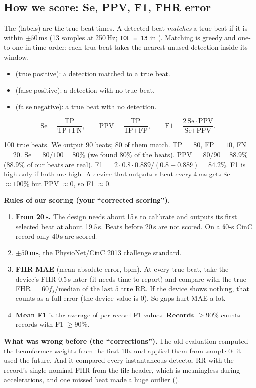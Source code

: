 \documentclass[11pt]{article}
\begin{document}
\subsection{How we score: Se, PPV, F1, FHR error}
\label{sec:scoring}
The  (labels) are the true beat times. A detected beat \emph{matches} a true beat if it is within $\pm 50$\,ms (13 samples at 250\,Hz; \texttt{TOL = 13} in ). Matching is greedy and one-to-one in time order: each true beat takes the nearest unused detection inside its window.
\begin{itemize}
  \item {} (true positive): a detection matched to a true beat.
  \item {} (false positive): a detection with no true beat.
  \item {} (false negative): a true beat with no detection.
\end{itemize}
\[
\text{Se} = \frac{\text{TP}}{\text{TP}+\text{FN}}, \qquad \text{PPV} = \frac{\text{TP}}{\text{TP}+\text{FP}}, \qquad \text{F1} = \frac{2\,\text{Se}\cdot\text{PPV}}{\text{Se}+\text{PPV}}.
\]
\begin{simple}
100 true beats. We output 90 beats; 80 of them match. TP $= 80$, FP $= 10$, FN $= 20$.
Se $= 80/100 = 80\%$ (we found 80\% of the beats). PPV $= 80/90 = 88.9\%$ (88.9\% of our beats are real). F1 $= 2\cdot 0.8\cdot 0.889/(0.8+0.889) = 84.2\%$.
F1 is high only if both are high. A device that outputs a beat every 4\,ms gets Se $\approx 100\%$ but PPV $\approx 0$, so F1 $\approx 0$.
\end{simple}

\textbf{Rules of our scoring (your ``corrected scoring'').}
\begin{enumerate}
  \item \textbf{From 20\,s.} The design needs about 15\,s to calibrate and outputs its first selected beat at about 19.5\,s. Beats before 20\,s are not scored. On a 60-s CinC record only 40\,s are scored.
  \item \textbf{$\pm 50$\,ms}, the PhysioNet/CinC 2013 challenge standard.
  \item \textbf{FHR MAE} (mean absolute error, bpm). At every true beat, take the device's FHR 0.5\,s later (it needs time to report) and compare with the true FHR $= 60 f_s / \text{median of the last 5 true RR}$. If the device shows nothing, that counts as a full error (the device value is 0). So gaps hurt MAE a lot.
  \item \textbf{Mean F1} is the average of per-record F1 values. \textbf{Records $\ge 90\%$} counts records with F1 $\ge 90\%$.
\end{enumerate}
\textbf{What was wrong before (the ``corrections'').} The old evaluation computed the beamformer weights from the first 10\,s and applied them from sample 0: it used the future. And it compared every instantaneous detector RR with the record's single nominal FHR from the file header, which is meaningless during accelerations, and one missed beat made a huge outlier ().
\end{document}
